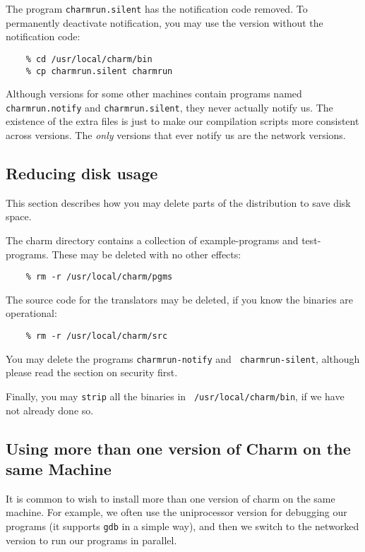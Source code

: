 The program {\tt charmrun.silent} has the notification code removed.  To
permanently deactivate notification, you may use the version without the
notification code:

\begin{verbatim}
    % cd /usr/local/charm/bin
    % cp charmrun.silent charmrun
\end{verbatim}

Although versions for some other machines contain
programs named {\tt charmrun.notify} and {\tt charmrun.silent}, they
never actually notify us.  The existence of the extra files is just to
make our compilation scripts more consistent across versions.  The
{\em only} versions that ever notify us are the network versions.

\subsection{Reducing disk usage}

This section describes how you may delete parts of the distribution to
save disk space.  

The charm directory contains a collection of example-programs and
test-programs.  These may be deleted with no other effects:

\begin{verbatim}
    % rm -r /usr/local/charm/pgms
\end{verbatim}

The source code for the translators may be deleted, if you know the
binaries are operational:

\begin{verbatim}
    % rm -r /usr/local/charm/src
\end{verbatim}

You may delete the programs {\tt charmrun-notify} and {\tt
charmrun-silent}, although please read the section on security first.

Finally, you may {\tt strip} all the binaries in {\tt
/usr/local/charm/bin}, if we have not already done so.

\subsection{Using more than one version of Charm on the same Machine}

It is common to wish to install more than one version of charm on the
same machine.  For example, we often use the uniprocessor version for
debugging our programs (it supports {\tt gdb} in a simple way), and
then we switch to the networked version to run our programs in
parallel.

